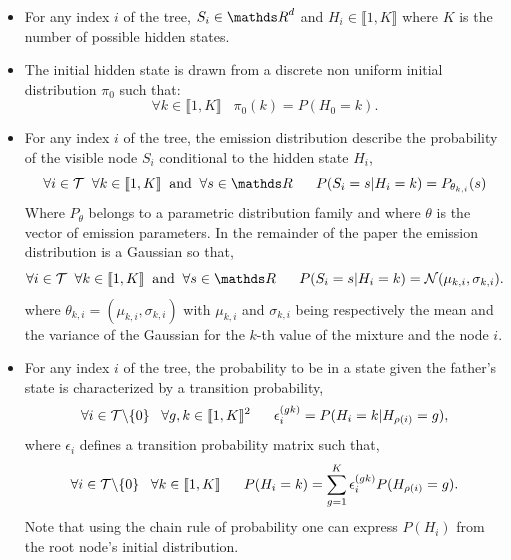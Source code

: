 \documentclass[a4paper,11pt]{report}
\begin{document}
    \begin{itemize}
      \item For any index $i$ of the tree, $S_{i} \in \dsR^{d}$ and $H_{i} \in \llbracket 1,K \rrbracket$ where $K$ is the number of possible hidden states.
      
      \item The initial hidden state is drawn from a discrete non uniform initial distribution $\pi_{0}$ such that:
	  	  \begin{equation}
					\forall k \in \llbracket 1,K \rrbracket \;\;\; \pi_{0}(k) = P(H_{0}=k).
					\label{eq:SCHMT - initial distribution}
				\end{equation}
				
      \item For any index $i$ of the tree, the emission distribution describe the probability of the visible node $S_{i}$ conditional to the hidden state $H_{i}$,
				\begin{equation}
				  \forall i \in \mcalT \;\; \forall k \in \llbracket1,K\rrbracket \;\; \text{and} \;\; \forall s \in \dsR
					\;\;\;\;\;\;P(S_{i}=s|H_{i}=k) = P_{\theta_{k,i}}(s)
					\label{eq:SCHMT - Emission distr}
				\end{equation}
				Where $P_{\theta}$ belongs to a parametric distribution family and where $\theta$ is the vector of emission parameters. In the remainder of the paper the emission distribution is a Gaussian so that,  
      	\begin{equation}
				  \forall i \in \mcalT \;\; \forall k \in \llbracket1,K\rrbracket \;\; \text{and} \;\; \forall s \in \dsR
					\;\;\;\;\;\; P(S_{i}=s | H_{i}=k) = \mcalN(\mu_{k,i},\sigma_{k,i}).
				  \label{eq:SCHMT - Mixt of Gaussian}
				\end{equation}
				where $\theta_{k,i}=(\mu_{k,i},\sigma_{k,i})$ with $\mu_{k,i}$ and $\sigma_{k,i}$ being respectively the mean and the variance of the Gaussian for the $k$-th value of the mixture and the node $i$.
				
			\item For any index $i$ of the tree, the probability to be in a state given the father's state is characterized by a transition probability,
				\begin{equation}
					\forall i \in \mathcal{T} \backslash \{ 0 \} \;\;\; \forall g,k \in \llbracket1,K\rrbracket^{2}
					\;\;\;\;\;\; \epsilon_{i}^{(gk)} = P(H_{i}= k | H_{\rho(i)}=g), 
					\label{eq:SCHMT - Transition matrix}
				\end{equation}
				where $\epsilon_{i}$ defines a transition probability matrix such that,
				\begin{equation}
				  \forall i \in \mcalT \backslash\{0\} \;\;\;  \forall k \in \llbracket1,K\rrbracket
					\;\;\;\;\;\;  P(H_{i}=k) = \sum_{g=1}^{K} \epsilon_{i}^{(gk)} P(H_{\rho(i)}=g). %
				  \label{eq:SCHMT - State proba 1}
				\end{equation}
				Note that using the chain rule of probability one can express $P(H_{i})$ from the root node's initial distribution.\\
		\end{itemize}
		
\end{document}
